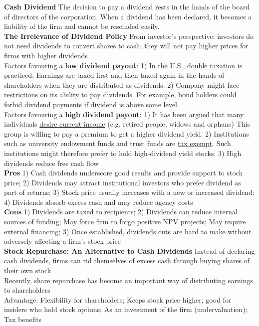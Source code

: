\documentclass[12pt,landscape, a4paper]{article}
\theoremstyle{remark}
\begin{document}
\begin{multicols*}{3}
\textbf{Cash Dividend} The decision to pay a dividend rests in the hands of the board of directors of the corporation. When a dividend has been declared, it becomes a liability of the firm and cannot be rescinded easily.\\

\textbf{The Irrelevance of Dividend Policy} From investor’s perspective: investors do not need dividends to convert shares to cash; they will not pay higher prices for firms with higher dividends\\

Factors favouring a \textbf{low dividend payout}: 1) In the U.S., \underline{double taxation} is practiced. Earnings are taxed first and then taxed again in the hands of shareholders when they are distributed as dividends. 2) Company might face \underline{restrictions} on its ability to pay dividends. For example, bond holders could forbid dividend payments if dividend is above some level\\

Factors favouring a \textbf{high dividend payout}: 1) It has been argued that many individuals \underline{desire current income} (e.g. retired people, widows and orphans) This group is willing to pay a premium to get a higher dividend yield. 2) Institutions such as university endowment funds and trust funds are \underline{tax exempt}. Such institutions might therefore prefer to hold high-dividend yield stocks. 3) High dividends reduce free cash flow\\
\textbf{Pros} 1) Cash dividends underscore good results and provide support to stock price; 2) Dividends may attract institutional investors who prefer dividend as part of returns; 3) Stock price usually increases with a new or increased dividend; 4) Dividends absorb excess cash and may reduce agency costs\\
\textbf{Cons} 1) Dividends are taxed to recipients; 2) Dividends can reduce internal sources of funding; May force firm to forgo positive NPV projects; May require external financing; 3) Once established, dividends cuts are hard to make without adversely affecting a firm’s stock price\\

\textbf{Stock Repurchase: An Alternative to Cash Dividends} Instead of declaring cash dividends, firms can rid themselves of excess cash through buying shares of their own stock\\
Recently, share repurchase has become an important way of distributing earnings to shareholders\\
Advantage: Flexibility for shareholders; Keeps stock price higher, good for insiders who hold stock options; As an investment of the firm (undervaluation); Tax benefits 


\end{multicols*}
\end{document}

